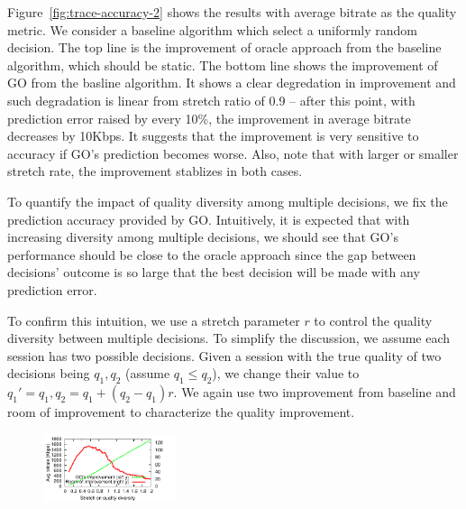 Figure~\ref{fig:trace-accuracy-2} shows the results with average bitrate as the quality metric. We consider a baseline algorithm which select a uniformly random decision. The top line is the improvement of oracle approach from the baseline algorithm, which should be static. The bottom line shows the improvement of GO from the basline algorithm. 
It shows a clear degredation in improvement and such degradation is linear from stretch ratio of 0.9 -- after this point, with prediction error raised by every 10\%, the improvement in average bitrate decreases by 10Kbps. It suggests that the improvement is very sensitive to accuracy if GO's prediction becomes worse. Also, note that with larger or smaller stretch rate, the improvement stablizes in both cases.





To quantify the impact of quality diversity among multiple decisions, we fix the prediction accuracy provided by GO. Intuitively, it is expected that with increasing diversity among multiple decisions, we should see that GO's performance should be close to the oracle approach since the gap between decisions' outcome is so large that the best decision will be made with any prediction error. 

To confirm this intuition, we use a stretch parameter $r$ to control the quality diversity between multiple decisions. To simplify the discussion, we assume each session has two possible decisions. Given a session with the true quality of two decisions being $q_1, q_2$ (assume $q_1\leq q_2$), we change their value to $q_1'=q_1, q_2=q_1+(q_2-q_1)r$. We again use two improvement from baseline and room of improvement to characterize the quality improvement.

\begin{figure}[h!]
\centering
\includegraphics[width=0.35\textwidth] {figures/newfig/trendDiversity-metricId1-keyGlobal-partition.pdf}
\label{fig:trace-diversity}
\end{figure}


